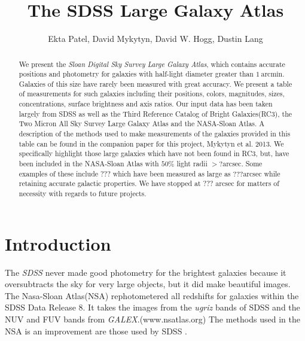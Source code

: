 \documentclass[12pt,preprint,pdftex]{aastex}
\newcounter{address}
\newcommand{\project}[1]{\textsl{#1}}
\newcommand{\units}[1]{\mathrm{#1}}
\renewcommand{\arcmin}{\units{arcmin}}
\renewcommand{\arcsec}{\units{arcsec}}
\begin{document}
\title{
       The SDSS Large Galaxy Atlas
      }
\author{
        Ekta Patel\altaffilmark{\ref{CCPP}},
        David Mykytyn\altaffilmark{\ref{CCPP}},
        David W. Hogg\altaffilmark{\ref{CCPP},\ref{MPIA},\ref{email}},
        Dustin Lang\altaffilmark{\ref{CMU}}
       }
\setcounter{address}{1}

\begin{abstract}
We present the \project{Sloan Digital Sky Survey Large Galaxy Atlas}, which contains
accurate positions and photometry for galaxies with half-light diameter
greater than $1~\arcmin$. Galaxies of this size have rarely been measured with great accuracy. We present a table of measurements for such galaxies including their positions, colors, magnitudes, sizes, concentrations, surface brightness and axis ratios. Our input data has been taken largely from SDSS as well as the Third Reference Catalog of Bright Galaxies(RC3), the Two Micron All Sky Survey Large Galaxy Atlas and the NASA-Sloan Atlas. A description of the methods used to make measurements of the galaxies provided in this table can be found in the companion paper for this project, Mykytyn et al. 2013. We specifically highlight those large galaxies which have not been found in RC3, but, have been included in the NASA-Sloan Atlas with $50\%$ light radii $>? \arcsec$. Some examples of these include ??? which have been measured as large as $???\arcsec$ while retaining accurate galactic properties. We have stopped at ??? $\arcsec$ for matters of necessity with regards to future projects.

\end{abstract}

\section{Introduction}

The \project{SDSS} never made good photometry for the brightest galaxies because it oversubtracts the sky for very large objects, but it did make beautiful images. The Nasa-Sloan Atlas(NSA) rephotometered all redshifts for galaxies within the SDSS Data Release 8. It takes the images from the \textit{ugriz} bands of SDSS and the NUV and FUV bands from \textit{GALEX}.(www.nsatlas.org) The methods used in the NSA is an improvement are those used by SDSS \citep{blanton11}.
\end{document}

